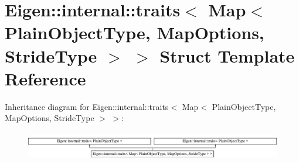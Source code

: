 \hypertarget{struct_eigen_1_1internal_1_1traits_3_01_map_3_01_plain_object_type_00_01_map_options_00_01_stride_type_01_4_01_4}{}\section{Eigen\+:\+:internal\+:\+:traits$<$ Map$<$ Plain\+Object\+Type, Map\+Options, Stride\+Type $>$ $>$ Struct Template Reference}
\label{struct_eigen_1_1internal_1_1traits_3_01_map_3_01_plain_object_type_00_01_map_options_00_01_stride_type_01_4_01_4}
Inheritance diagram for Eigen\+:\+:internal\+:\+:traits$<$ Map$<$ Plain\+Object\+Type, Map\+Options, Stride\+Type $>$ $>$\+:\begin{figure}[H]
\begin{center}
\leavevmode
\includegraphics[height=1.255605cm]{struct_eigen_1_1internal_1_1traits_3_01_map_3_01_plain_object_type_00_01_map_options_00_01_stride_type_01_4_01_4}
\end{center}
\end{figure}
